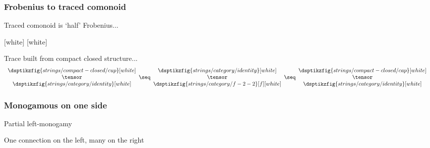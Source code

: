 \begin{frame}
    \frametitle{Frobenius to traced comonoid}

    \centering
    \vspace{0.5em}
    \Large
    Traced comonoid is `half' Frobenius...

    \normalsize

    [white]
    [white]

    \pause

    \vspace{1em}

    \Large
    Trace built from compact closed structure...
    \[
        \begin{array}{c}
            \dsptikzfig{strings/compact-closed/cup}[white]
            \\
            \tensor
            \\
            \dsptikzfig{strings/category/identity}[white]
        \end{array}
        \seq
        \begin{array}{c}
            \dsptikzfig{strings/category/identity}[white]
            \\
            \tensor
            \\
            \dsptikzfig{strings/category/f-2-2}[f][white]
        \end{array}
        \seq
        \begin{array}{c}
            \dsptikzfig{strings/compact-closed/cap}[white]
            \\
            \tensor
            \\
            \dsptikzfig{strings/category/identity}[white]
        \end{array}
    \]
\end{frame}

\begin{frame}
    \frametitle{Monogamous on one side}

    \centering

    \LARGE
    \alert{Partial left}-monogamy

    \scalebox{0.5}{\meanddan}

    \pause
    \normalsize

    One connection on the \alert{left}, many on the \alert{right}

    \pause

\end{frame}

